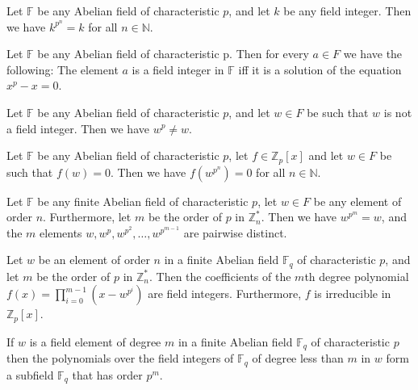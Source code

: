 \documentclass[a4paper]{article}
\begin{document}
\begin{corollary}
Let $\mathbb{F}$ be any Abelian field of characteristic $p$, and let $k$ be any field integer. Then we have $k^{p^{n}} = k$ for all $n \in \mathbb{N}$.
\end{corollary}


\begin{theorem}
Let $\mathbb{F}$ be any Abelian field of characteristic p. Then for every $a \in F$ we have the following: The element $a$ is a field integer in $\mathbb{F}$ iff it is a solution of the equation $x^{p} - x = 0$.
\end{theorem}


\begin{corollary}
Let $\mathbb{F}$ be any Abelian field of characteristic $p$, and let $w \in F$ be such that $w$ is not a field integer. Then we have $w^{p} \neq w$.
\end{corollary}


\begin{theorem}
Let $\mathbb{F}$ be any Abelian field of characteristic $p$, let $f \in \mathbb{Z}_{p}[x]$ and let $w \in F$ be such that $f(w) = 0$. Then we have $f(w^{p^{n}}) = 0$ for all $n \in \mathbb{N}$.
\end{theorem}


\begin{theorem}
Let $\mathbb{F}$ be any finite Abelian field of characteristic $p$, let $w \in F$ be any element of order $n$. Furthermore, let $m$ be the order of $p$ in $\mathbb{Z}_{n}^{*}$. Then we have $w^{p^{m}} = w$, and the $m$ elements $w, w^{p}, w^{p^{2}}, \ldots, w^{p^{m-1}}$ are pairwise distinct.
\end{theorem}


\begin{theorem}
Let $w$ be an element of order $n$ in a finite Abelian field $\mathbb{F}_{q}$ of characteristic $p$, and let $m$ be the order of $p$ in $\mathbb{Z}_{n}^{*}$. Then the coefficients of the $m$th degree polynomial $f(x) = \prod_{i=0}^{m-1}\left( x - w^{p^{i}} \right)$ are field integers. Furthermore, $f$ is irreducible in $\mathbb{Z}_{p}[x]$.
\end{theorem}


\begin{theorem}
If $w$ is a field element of degree $m$ in a finite Abelian field $\mathbb{F}_{q}$ of characteristic $p$ then the polynomials over the field integers of $\mathbb{F}_{q}$ of degree less than $m$ in $w$ form a subfield $\mathbb{F}_{q}$ that has order $p^{m}$.
\end{theorem}
\end{document}
